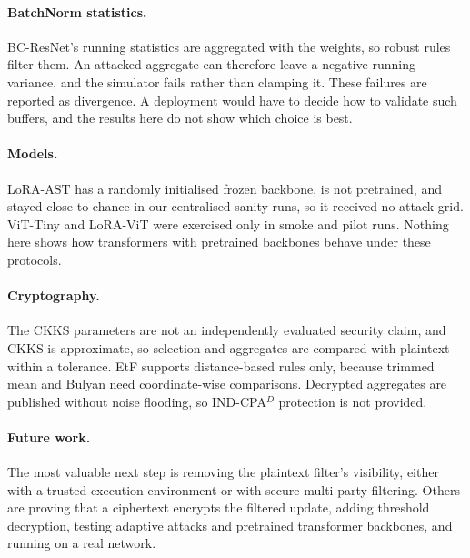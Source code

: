 \paragraph{BatchNorm statistics.}
BC-ResNet's running statistics are aggregated with the weights, so robust rules filter them. An attacked aggregate can therefore leave a negative running variance, and the simulator fails rather than clamping it. These failures are reported as divergence. A deployment would have to decide how to validate such buffers, and the results here do not show which choice is best.

\paragraph{Models.}
LoRA-AST has a randomly initialised frozen backbone, is not pretrained, and stayed close to chance in our centralised sanity runs, so it received no attack grid. ViT-Tiny and LoRA-ViT were exercised only in smoke and pilot runs. Nothing here shows how transformers with pretrained backbones behave under these protocols.

\paragraph{Cryptography.}
The CKKS parameters are not an independently evaluated security claim, and CKKS is approximate, so selection and aggregates are compared with plaintext within a tolerance. EtF supports distance-based rules only, because trimmed mean and Bulyan need coordinate-wise comparisons. Decrypted aggregates are published without noise flooding, so IND-CPA$^D$ protection is not provided.

\paragraph{Future work.}
The most valuable next step is removing the plaintext filter's visibility, either with a trusted execution environment or with secure multi-party filtering. Others are proving that a ciphertext encrypts the filtered update, adding threshold decryption, testing adaptive attacks and pretrained transformer backbones, and running on a real network.
